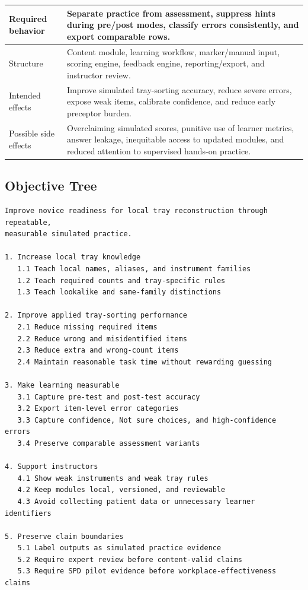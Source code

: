 \documentclass[10pt,a4paper]{article}
\begin{document}
\begin{table}[H]
\begin{tabularx}{\textwidth}{|>{\raggedright\arraybackslash}X|>{\raggedright\arraybackslash}X|}
\hline
Required behavior & Separate practice from assessment, suppress hints during pre/post modes, classify errors consistently, and export comparable rows. \\
\hline
Structure & Content module, learning workflow, marker/manual input, scoring engine, feedback engine, reporting/export, and instructor review. \\
\hline
Intended effects & Improve simulated tray-sorting accuracy, reduce severe errors, expose weak items, calibrate confidence, and reduce early preceptor burden. \\
\hline
Possible side effects & Overclaiming simulated scores, punitive use of learner metrics, answer leakage, inequitable access to updated modules, and reduced attention to supervised hands-on practice. \\
\hline
\end{tabularx}
\end{table}
\subsection{Objective Tree}


\begin{lstlisting}
Improve novice readiness for local tray reconstruction through repeatable,
measurable simulated practice.

1. Increase local tray knowledge
   1.1 Teach local names, aliases, and instrument families
   1.2 Teach required counts and tray-specific rules
   1.3 Teach lookalike and same-family distinctions

2. Improve applied tray-sorting performance
   2.1 Reduce missing required items
   2.2 Reduce wrong and misidentified items
   2.3 Reduce extra and wrong-count items
   2.4 Maintain reasonable task time without rewarding guessing

3. Make learning measurable
   3.1 Capture pre-test and post-test accuracy
   3.2 Export item-level error categories
   3.3 Capture confidence, Not sure choices, and high-confidence errors
   3.4 Preserve comparable assessment variants

4. Support instructors
   4.1 Show weak instruments and weak tray rules
   4.2 Keep modules local, versioned, and reviewable
   4.3 Avoid collecting patient data or unnecessary learner identifiers

5. Preserve claim boundaries
   5.1 Label outputs as simulated practice evidence
   5.2 Require expert review before content-valid claims
   5.3 Require SPD pilot evidence before workplace-effectiveness claims
\end{lstlisting}
\end{document}
